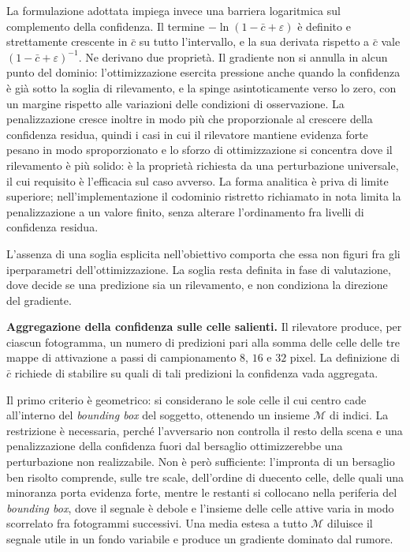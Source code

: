 \documentclass[a4paper,12pt]{report}
\begin{document}
La formulazione adottata impiega invece una barriera logaritmica sul complemento
della confidenza. Il termine $-\ln(1 - \bar{c} + \varepsilon)$ è definito e
strettamente crescente in $\bar{c}$ su tutto l'intervallo, e la sua derivata
rispetto a $\bar{c}$ vale $(1 - \bar{c} + \varepsilon)^{-1}$. Ne derivano due
proprietà. Il gradiente non si annulla in alcun punto del dominio:
l'ottimizzazione esercita pressione anche quando la confidenza è già sotto la
soglia di rilevamento, e la spinge asintoticamente verso lo zero, con un
margine rispetto alle variazioni delle condizioni di osservazione. La
penalizzazione cresce inoltre in modo più che proporzionale al crescere della
confidenza residua, quindi i casi in cui il rilevatore mantiene evidenza forte
pesano in modo sproporzionato e lo sforzo di ottimizzazione si concentra dove il
rilevamento è più solido: è la proprietà richiesta da una perturbazione
universale, il cui requisito è l'efficacia sul caso avverso. La forma analitica
è priva di limite superiore; nell'implementazione il codominio ristretto
richiamato in nota limita la penalizzazione a un valore finito, senza alterare
l'ordinamento fra livelli di confidenza residua.

L'assenza di una soglia esplicita nell'obiettivo comporta che essa non figuri
fra gli iperparametri dell'ottimizzazione. La soglia resta definita in fase di
valutazione, dove decide se una predizione sia un rilevamento, e non
condiziona la direzione del gradiente.

\textbf{Aggregazione della confidenza sulle celle salienti.}
\label{sec:topk}
Il rilevatore produce, per ciascun fotogramma, un numero di predizioni pari alla
somma delle celle delle tre mappe di attivazione a passi di campionamento $8$,
$16$ e $32$ pixel. La definizione di $\bar{c}$ richiede di stabilire su quali di
tali predizioni la confidenza vada aggregata.

Il primo criterio è geometrico: si considerano le sole celle il cui centro cade
all'interno del \textit{bounding box} del soggetto, ottenendo un insieme
$\mathcal{M}$ di indici. La restrizione è necessaria, perché l'avversario non
controlla il resto della scena e una penalizzazione della confidenza fuori dal
bersaglio ottimizzerebbe una perturbazione non realizzabile. Non è però
sufficiente: l'impronta di un bersaglio ben risolto comprende, sulle tre scale,
dell'ordine di duecento celle, delle quali una minoranza porta evidenza forte,
mentre le restanti si collocano nella periferia del \textit{bounding box}, dove
il segnale è debole e l'insieme delle celle attive varia in modo scorrelato fra
fotogrammi successivi. Una media estesa a tutto $\mathcal{M}$ diluisce il
segnale utile in un fondo variabile e produce un gradiente dominato dal rumore.
\end{document}

